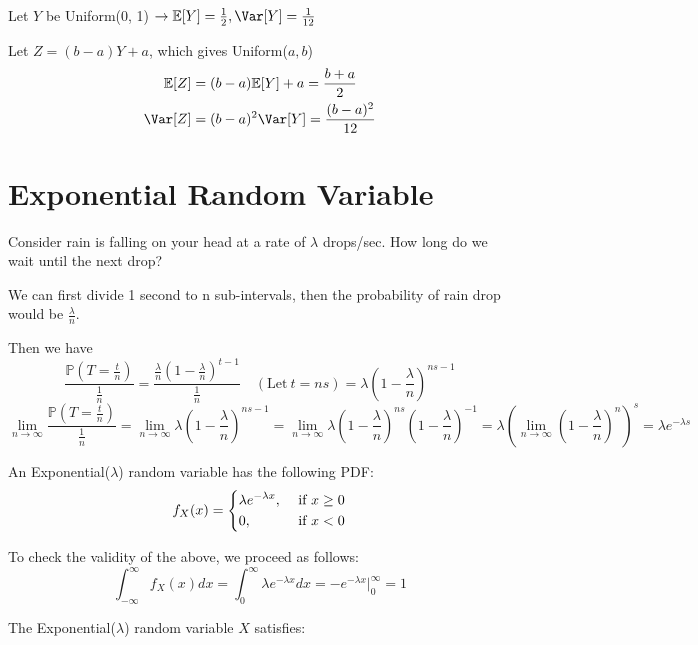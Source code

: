     Let \(Y\) be Uniform(0, 1) \(\rightarrow \mathbb{E}[Y] = \frac{1}{2}, \Var[Y] = \frac{1}{12}\) 

    Let \(Z = (b - a)Y + a\), which gives Uniform(\(a, b\)) 
    \[
    \begin{aligned}
        \mathbb{E}[Z] &= (b - a)\mathbb{E}[Y] + a = \frac{b + a}{2} \\
        \Var[Z] &= (b - a)^2 \Var[Y] = \frac{(b - a)^2}{12}
    \end{aligned}
    \]

\section{Exponential Random Variable}

Consider rain is falling on your head at a rate of \(\lambda\) drops/sec. How long do we wait until the next drop?

We can first divide 1 second to n sub-intervals, then the probability of rain drop would be \(\frac{\lambda}{n}\). 

Then we have 
\[
    \dfrac{\mathbb{P}(T = \frac{t}{n})}{\frac{1}{n}} = \frac{\frac{\lambda}{n}\left(1 - \frac{\lambda}{n}\right)^{t-1}}{\frac{1}{n}} \quad(\text{Let}\ t = ns) = \lambda\left(1 - \dfrac{\lambda}{n}\right)^{ns-1}
\]
\[
    \lim_{n \to \infty} \dfrac{\mathbb{P}(T = \frac{t}{n})}{\frac{1}{n}} = \lim_{n \to \infty} \lambda\left(1 - \dfrac{\lambda}{n}\right)^{ns-1} = \lim_{n \to \infty} \lambda\left(1 - \dfrac{\lambda}{n}\right)^{ns}\left(1 - \dfrac{\lambda}{n}\right)^{-1} = \lambda \left(\lim_{n \to \infty} \left(1 - \dfrac{\lambda}{n}\right)^n\right)^s = \lambda e^{-\lambda s}
\]

\begin{definition}
    An Exponential(\(\lambda\)) random variable has the following PDF: 
    \[
        f_X(x) = \begin{dcases}
            \lambda e^{-\lambda x} , &\text{ if }  x \geq 0\\
            0 , &\text{ if } x < 0
        \end{dcases}
    \]
\end{definition}

To check the validity of the above, we proceed as follows:
\[
    \int_{-\infty}^{\infty} f_X(x)dx = \int_0^{\infty} \lambda e^{-\lambda x} dx = -e^{-\lambda x} \Big|_0^{\infty} = 1
\]

The Exponential(\(\lambda\)) random variable \(X\) satisfies:

